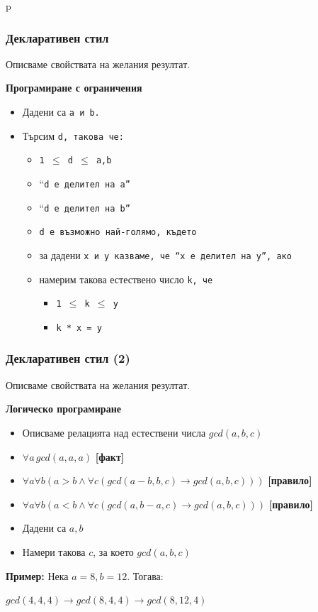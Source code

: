 p\documentclass{beamer}
\begin{document}
\begin{frame}
  \frametitle{Декларативен стил}

  Описваме свойствата на желания резултат.
  \vspace{1em}

  \textbf{Програмиране с ограничения}

  \begin{itemize}
  \item Дадени са \tt a и \tt b.
  \item Търсим \tt d, такова че:
    \begin{itemize}
    \item \tt{1 $\leq$ d $\leq$ a,b}
    \item ``\tt d е делител на \tt a''
    \item ``\tt d е делител на \tt b''
    \item \tt d е възможно най-голямо, където
    \item за дадени \tt x и \tt y казваме, че ``\tt x е делител на \tt y'', ако
    \item намерим такова естествено число \tt k, че
      \begin{itemize}
      \item \tt{1 $\leq$ k $\leq$ y}
      \item \tt k * \tt x = \tt y
      \end{itemize}
    \end{itemize}
  \end{itemize}
\end{frame}

\begin{frame}
  \frametitle{Декларативен стил (2)}

  Описваме свойствата на желания резултат.
  \vspace{1em}

  \textbf{Логическо програмиране}

  \begin{itemize}
  \item Описваме релацията над естествени числа $gcd(a,b,c)$
  \item $\forall a \, gcd(a,a,a)$ \textbf{[факт]}

  \item $\forall a\forall b ( a > b \land \forall c (gcd(a-b,b,c) \rightarrow gcd(a,b,c)))$ \textbf{[правило]}
  \item $\forall a\forall b ( a < b \land \forall c (gcd(a,b-a,c) \rightarrow gcd(a,b,c)))$ \textbf{[правило]}
  \item Дадени са $a, b$
  \item Намери такова $c$, за което $gcd(a,b,c)$
  \end{itemize}

  \pause

  \textbf{Пример:}
  Нека $a = 8, b = 12$. Тогава:

  $gcd(4,4,4) \rightarrow gcd(8,4,4) \rightarrow gcd(8,12,4)$
\end{frame}
\end{document}
